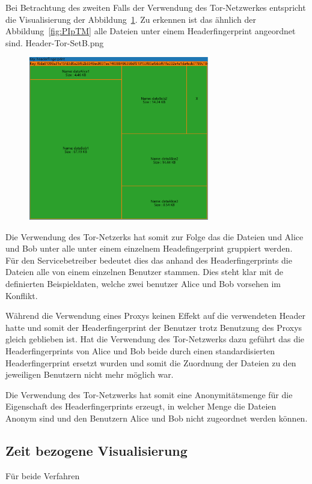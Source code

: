 \documentclass[
    fontsize=12pt,
    headings=small,
    parskip=half,           %
    bibliography=totoc,
    numbers=noenddot,       %
    open=any,               %
    ]{scrreprt}
\begin{document}
Bei Betrachtung des zweiten Falls der Verwendung des Tor-Netzwerkes entspricht die Visualisierung der Abbildung~\ref{fig:THTM}.
Zu erkennen ist das ähnlich der Abbildung~\ref{fig:PIpTM} alle Dateien unter einem Headerfingerprint angeordnet sind.
Header-Tor-SetB.png
\begin{figure}[H]
\includegraphics[width=0.7\textwidth]{../pic/Header-Tor-SetB.png}
\label{fig:THTM}
\end{figure}

Die Verwendung des Tor-Netzerks hat somit zur Folge das die Dateien und Alice und Bob unter alle unter einem einzelnem Headefingerprint gruppiert werden. 
Für den Servicebetreiber bedeutet dies das anhand des Headerfingerprints die Dateien alle von einem einzelnen Benutzer stammen. 
Dies steht klar mit de definierten Beispieldaten, welche zwei benutzer Alice und Bob vorsehen im Konflikt.

Während die Verwendung eines Proxys keinen Effekt auf die verwendeten Header hatte und somit der Headerfingerprint der Benutzer trotz Benutzung des Proxys gleich geblieben ist. 
Hat die Verwendung des Tor-Netzwerks dazu geführt das die Headerfingerprints von Alice und Bob beide durch einen standardisierten Headerfingerprint ersetzt wurden und somit die Zuordnung der Dateien zu den jeweiligen Benutzern nicht mehr möglich war.

Die Verwendung des Tor-Netzwerks hat somit eine Anonymitätsmenge für die Eigenschaft des Headerfingerprints erzeugt, in welcher Menge die Dateien Anonym sind und den Benutzern Alice und Bob nicht zugeordnet werden können.

    \subsection{Zeit bezogene Visualisierung}
Für beide Verfahren 
    
\end{document}
